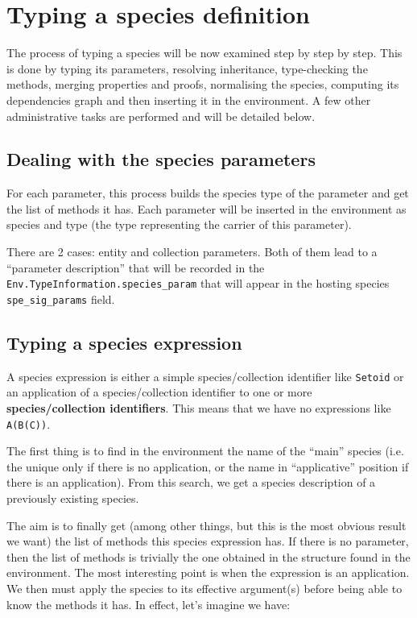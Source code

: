 \section{Typing a species definition}
The process of typing a species will be now examined step by step by
step. This is done by typing its parameters, resolving inheritance,
type-checking the methods, merging properties and proofs, normalising
the species, computing its dependencies graph and then inserting it in
the environment. A few other administrative tasks are performed and
will be detailed below.

\subsection{Dealing with the species parameters}
For each parameter, this process builds the species type of the
parameter and get the list of methods it has. Each parameter will be
inserted in the environment as species and type (the type representing
the carrier of this parameter).

\medskip
There are 2 cases: entity and collection parameters. Both of them lead
to a ``parameter description'' that will be recorded in the
{\tt Env.TypeInformation.species\_param} that will appear in the
hosting species {\tt spe\_sig\_params} field.


\subsection{Typing a species expression}
\label{typing-a-species-expression}
A species expression is either a simple species/collection identifier
like {\tt Setoid} or an application of a species/collection identifier
to one or more {\bf species/collection identifiers}. This means that
we have no expressions like {\tt A(B(C))}.

The first thing is to find in the environment the name of the ``main''
species (i.e. the unique only if there is no application, or the name
in ``applicative'' position if there is an application). From this
search, we get a species description of a previously existing species.

The aim is to finally get (among other things, but this is the most
obvious result we want) the list of methods this species expression
has. If there is no parameter, then the list of methods is trivially
the one obtained in the structure found in the environment. The most
interesting point is when the expression is an application. We then
must apply the species to its effective argument(s) before being able
to know the methods it has. In effect, let's imagine we have:

